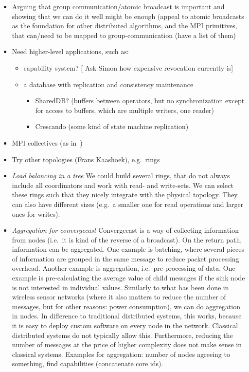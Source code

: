 \documentclass{article}
\newcommand{\stefan}[1]{
  {\color{skRed}[{\color{red}{SK}} #1]}}
\begin{document}
\begin{itemize}
\item Arguing that group communication/atomic broadcast is important
  and showing that we can do it well might be enough (appeal to atomic
  broadcasts as the foundation for other distributed algorithms, and
  the MPI primitives, that can/need to be mapped to
  group-communication (have a list of them)
\item Need higher-level applications, such as:
  \begin{itemize}
  \item capability system? \stefan{Ask Simon how expensive revocation
      currently is}
  \item a database with replication and consistency maintenance
    \begin{itemize}
    \item SharedDB? (buffers between operators, but no synchronization
      except for access to buffers, which are multiple writers, one
      reader)
    \item Crescando (some kind of state machine replication)
    \end{itemize}
  \end{itemize}
\item MPI collectives (as in~\cite{Tu2008})
\item Try other topologies (Frans Kaashoek), e.g.\ rings
\item \emph{Load balancing in a tree} We could build several rings,
  that do not always include all coordinators and work with read- and
  write-sets. We can select these rings such that they nicely
  integrate with the physical topology. They can also have different
  sizes (e.g.\ a smaller one for read operations and larger ones for
  writes).
\item \emph{Aggregation for convergecast} %
  Convergecast is a way of collecting information from nodes (i.e.\ it
  is kind of the reverse of a broadcast). On the return path,
  information can be aggregated. One example is batching, where several
  pieces of information are grouped in the same message to reduce packet
  processing overhead. Another example is aggregation, i.e.\
  pre-processing of data. One example is pre-calculating the average
  value of child messages if the sink node is not interested in
  individual values. %
  Similarly to what has been done in wireless sensor networks (where it
  also matters to reduce the number of messages, but for other reasons:
  power consumption), we can do aggregation in nodes. In difference to
  traditional distributed systems, this works, because it is easy to
  deploy custom software on every node in the network. Classical
  distributed systems do not typically allow this. Furthermore, reducing
  the number of messages at the price of higher complexity does not make
  sense in classical systems. %
  Examples for aggregation: number of nodes agreeing to something, find
  capabilities (concatenate core ids). 
\end{itemize}
\end{document}
